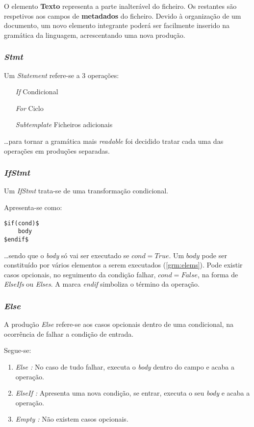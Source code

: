 \documentclass[../relatorio.tex]{subfiles}
\begin{document}
O elemento \textbf{Texto} representa a parte inalterável do 
ficheiro. 
Os restantes são respetivos aos campos de \textbf{metadados}
do ficheiro.
Devido à organização de um documento, um novo elemento integrante 
poderá ser facilmente inserido
na gramática da linguagem, acrescentando uma nova produção.

\subsubsection{\textit{Stmt}}\label{grm:stmt}
Um \textit{Statement} refere-se a 3 operações:
\begin{enumerate}
    \item[\textit{If}]         {Condicional}
    \item[\textit{For}]        {Ciclo}
    \item[\textit{Subtemplate}]{Ficheiros adicionais}
\end{enumerate}
\dots para tornar a gramática mais \textit{readable}
foi decidido tratar cada uma das operações em 
produções separadas.

\subsubsection{\textit{IfStmt}} \label{grm:ifstmt}
Um \textit{IfStmt} trata-se de uma transformação
condicional.

Apresenta-se como:
\begin{verbatim}    
$if(cond)$
    body
$endif$
\end{verbatim}
\dots sendo que o \textit{body} só vai ser executado
se $cond=True$. 
Um $body$ pode ser constituído por 
vários elementos a serem executados (\ref{grm:elems}).
Pode existir casos opcionais, no seguimento da condição falhar, 
$cond=False$, na forma de \textit{ElseIfs} ou \textit{Elses}.
A marca \textit{endif} simboliza o término da operação.

\subsubsection{\textit{Else}} \label{grm:else}
A produção \textit{Else} refere-se aos casos opcionais 
dentro de uma condicional, na ocorrência de falhar a 
condição de entrada.

Segue-se:
\begin{enumerate}
    \item \textit{Else :} No caso de tudo falhar, executa o \textit{body} dentro do campo
                          e acaba a operação.
    \item \textit{ElseIf :} Apresenta uma nova condição, se entrar, executa o seu \textit{body}
                            e acaba a operação.
    \item \textit{Empty :} Não existem casos opcionais.
\end{enumerate}
\end{document}
